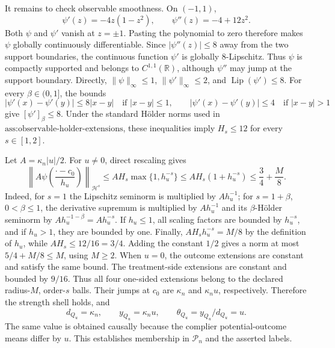 It remains to check observable smoothness.  On \((-1,1)\),
\[
 \psi'(z)=-4z(1-z^2),
 \qquad
 \psi''(z)=-4+12z^2.
\]
Both \(\psi\) and \(\psi'\) vanish at \(z=\pm1\).  Pasting the
polynomial to zero therefore makes \(\psi\) globally continuously
differentiable.  Since \(|\psi''(z)|\le8\) away from the two support
boundaries, the continuous function \(\psi'\) is globally
\(8\)-Lipschitz.  Thus \(\psi\) is compactly supported and belongs to
\(C^{1,1}(\mathbb R)\), although \(\psi''\) may jump at the support
boundary.  Directly,
\(\|\psi\|_\infty\le1\), \(\|\psi'\|_\infty\le2\), and
\(\operatorname{Lip}(\psi')\le8\).  For every
\(\beta\in(0,1]\), the bounds
\[
 |\psi'(x)-\psi'(y)|
 \le 8|x-y|\quad\text{if }|x-y|\le1,
 \qquad
 |\psi'(x)-\psi'(y)|\le4\quad\text{if }|x-y|>1
\]
give \([\psi']_\beta\le8\).  Under the standard H\"older norms used in
\(\text{ass:observable-holder-extensions}\), these inequalities imply
\(H_s\le12\) for every \(s\in[1,2]\).

Let \(A=\kappa_n|u|/2\).  For \(u\ne0\), direct rescaling gives
\[
 \left\|A\psi\!\left(\frac{\cdot-c_0}{h_u}\right)
 \right\|_{\mathcal H^s}
 \le A H_s\max\{1,h_u^{-s}\}
 \le A H_s(1+h_u^{-s})
 \le \frac34+\frac{M}{8}.
\]
Indeed, for \(s=1\) the Lipschitz seminorm is multiplied by
\(Ah_u^{-1}\); for \(s=1+\beta\), \(0<\beta\le1\), the derivative
supremum is multiplied by \(Ah_u^{-1}\) and its \(\beta\)-H\"older
seminorm by \(Ah_u^{-1-\beta}=Ah_u^{-s}\).  If \(h_u\le1\), all
scaling factors are bounded by \(h_u^{-s}\), and if \(h_u>1\), they are
bounded by one.  Finally,
\(AH_sh_u^{-s}=M/8\) by the definition of \(h_u\), while
\(AH_s\le12/16=3/4\).  Adding the constant \(1/2\) gives a norm at most
\(5/4+M/8\le M\), using \(M\ge2\).  When \(u=0\), the outcome
extensions are constant and satisfy the same bound.  The treatment-side
extensions are constant and bounded by \(9/16\).  Thus all four
one-sided extensions belong to the declared radius-\(M\), order-\(s\)
balls.  Their jumps at \(c_0\) are \(\kappa_n\) and \(\kappa_nu\),
respectively.  Therefore the strength shell holds, and
\[
 d_{Q_u}=\kappa_n,
 \qquad y_{Q_u}=\kappa_nu,
 \qquad \theta_{Q_u}=y_{Q_u}/d_{Q_u}=u.
\]
The same value is obtained causally because the complier
potential-outcome means differ by \(u\).  This establishes membership in
\(\mathcal P_n\) and the asserted labels.

